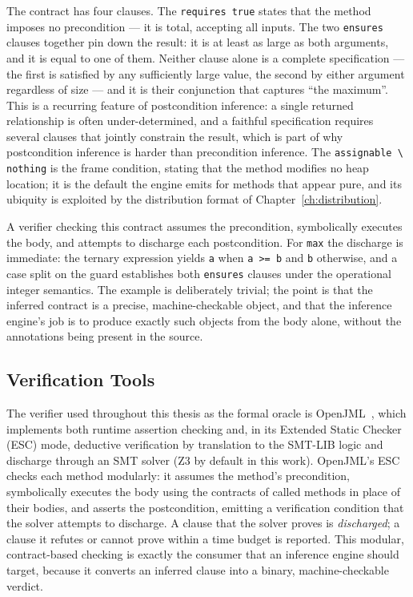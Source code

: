 The contract has four clauses. The \texttt{requires true} states that the
method imposes no precondition --- it is total, accepting all inputs. The two
\texttt{ensures} clauses together pin down the result: it is at least as large
as both arguments, and it is equal to one of them. Neither clause alone is a
complete specification --- the first is satisfied by any sufficiently large
value, the second by either argument regardless of size --- and it is their
conjunction that captures ``the maximum''. This is a recurring feature of
postcondition inference: a single returned relationship is often
under-determined, and a faithful specification requires several clauses that
jointly constrain the result, which is part of why postcondition inference is
harder than precondition inference. The \texttt{assignable \textbackslash
nothing} is the frame condition, stating that the method modifies no heap
location; it is the default the engine emits for methods that appear pure, and
its ubiquity is exploited by the distribution format of
Chapter~\ref{ch:distribution}.

A verifier checking this contract assumes the precondition, symbolically
executes the body, and attempts to discharge each postcondition. For
\texttt{max} the discharge is immediate: the ternary expression yields \texttt{a}
when \texttt{a >= b} and \texttt{b} otherwise, and a case split on the guard
establishes both \texttt{ensures} clauses under the operational integer
semantics. The example is deliberately trivial; the point is that the inferred
contract is a precise, machine-checkable object, and that the inference engine's
job is to produce exactly such objects from the body alone, without the
annotations being present in the source.

\subsection{Verification Tools}

The verifier used throughout this thesis as the formal oracle is
OpenJML~\cite{openjml}, which implements both runtime assertion checking and,
in its Extended Static Checker (ESC) mode, deductive verification by
translation to the SMT-LIB logic and discharge through an SMT solver (Z3 by
default in this work). OpenJML's ESC checks each method modularly: it assumes
the method's precondition, symbolically executes the body using the contracts
of called methods in place of their bodies, and asserts the postcondition,
emitting a verification condition that the solver attempts to discharge. A
clause that the solver proves is \emph{discharged}; a clause it refutes or
cannot prove within a time budget is reported. This modular, contract-based
checking is exactly the consumer that an inference engine should target,
because it converts an inferred clause into a binary, machine-checkable
verdict.


